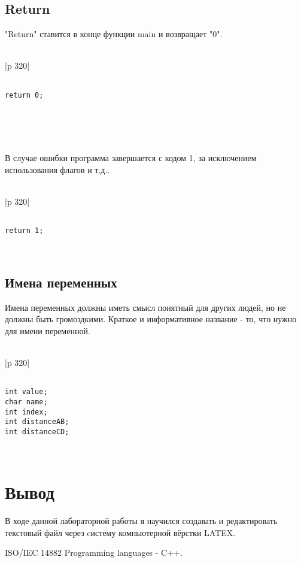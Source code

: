 \documentclass{article}
\begin{document}
\subsection{Return}
"Return" ставится в конце функции main и возвращает "0".\\
\\
\begin{tabular}{|p {320}|}
\hline
\begin{verbatim}

return 0;

\end{verbatim}
\\
\hline      
\end{tabular}
\\
\\
В случае ошибки программа завершается с кодом 1, за исключением использования флагов и т.д..\\
\\
\begin{tabular}{|p {320}|}
\hline
\begin{verbatim}

return 1;

\end{verbatim}
\\
\hline      
\end{tabular}

\subsection{Имена переменных}
Имена переменных должны иметь смысл понятный для других людей, но не должны быть громоздкими.
Краткое и информативное название - то, что нужно для имени переменной. \\
\\
\begin{tabular}{|p {320}|}
\hline
\begin{verbatim}

int value;
char name;
int index;
int distanceAB;
int distanceCD;

\end{verbatim}
\\
\hline      
\end{tabular}
\section{Вывод}
В ходе данной лабораторной работы я научился создавать и редактировать текстовый файл через cистему компьютерной вёрстки LATEX.  

\begin{thebibliography}{1}
ISO/IEC 14882 Programming languages - C++.\\
\end{thebibliography}
%
\end{document}
